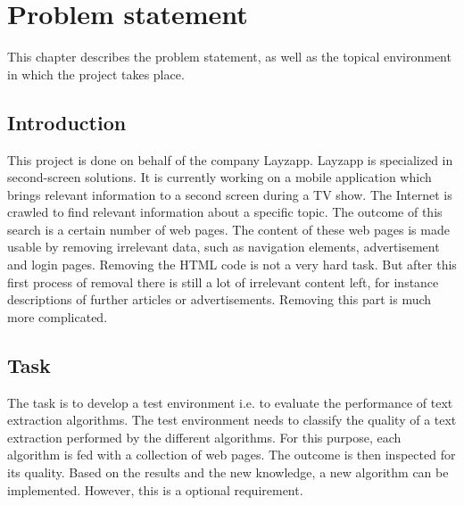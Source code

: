 
\chapter{Problem statement} %

\label{Problem statement} %



This chapter describes the problem statement, as well as the topical environment in which the project takes place.


\section{Introduction}

This project is done on behalf of the company Layzapp. Layzapp is specialized in second-screen solutions. It is currently working on a mobile application which brings relevant information to a second screen during a TV show. The Internet is crawled to find relevant information about a specific topic. The outcome of this search is a certain number of web pages. The content of these web pages is made usable by removing irrelevant data, such as navigation elements, advertisement and login pages. Removing the HTML code is not a very hard task. But after this first process of removal there is still a lot of irrelevant content left, for instance descriptions of further articles or advertisements. Removing this part is much more complicated. 

\section{Task}

The task is to develop a test environment i.e. to evaluate the performance of text extraction algorithms. The test environment needs to classify the quality of a text extraction performed by the different algorithms. For this purpose, each algorithm is fed with a collection of web pages. The outcome is then inspected for its quality. Based on the results and the new knowledge, a new algorithm can be implemented. However, this is a optional requirement.

